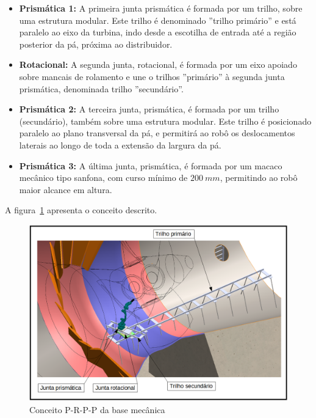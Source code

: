 \begin{itemize} 

	\item\textbf{Prismática 1:} A primeira junta prismática é formada por um
	trilho, sobre uma estrutura modular. Este trilho é denominado ''trilho
	primário'' e está paralelo ao eixo da turbina, indo desde a escotilha de
	entrada até a região posterior da pá, próxima ao distribuidor.

	\item\textbf{Rotacional:} A segunda junta, rotacional, é formada por um
	eixo apoiado sobre mancais de rolamento e une o trilhos ''primário'' à segunda
	junta prismática, denominada trilho ''secundário''.

	\item\textbf{Prismática 2:} A terceira junta,
	prismática, é formada por um trilho (secundário), também
	sobre uma estrutura modular. Este trilho é posicionado paralelo ao plano
	transversal da pá, e permitirá ao robô os deslocamentos laterais ao longo de
	toda a extensão da largura da pá. 

	\item\textbf{Prismática 3:} A última junta, prismática, é formada por um
	macaco mecânico tipo sanfona, com curso mínimo de $200~mm$, permitindo ao robô
	maior alcance em altura.
	
\end{itemize}

A figura~\ref{fig::conceito} apresenta o conceito descrito.

\begin{figure}[h!]
	\centering
	\includegraphics[width=0.9\columnwidth]{method/figs/conceito/conceito_P-R-P-P_01_tags}
	\caption{Conceito P-R-P-P da base mecânica}
    \label{fig::conceito}
\end{figure}

